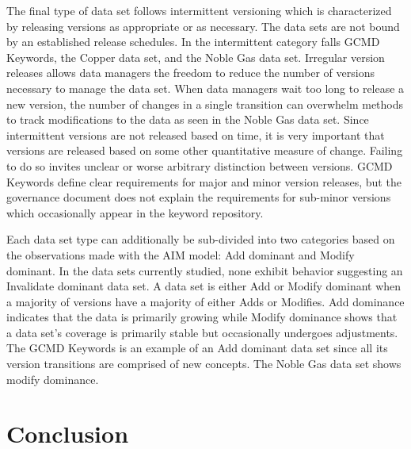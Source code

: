 The final type of data set follows intermittent versioning which is characterized by releasing versions as appropriate or as necessary.  The data sets are not bound by an established release schedules.  In the intermittent category falls GCMD Keywords, the Copper data set, and the Noble Gas data set.  Irregular version releases allows data managers the freedom to reduce the number of versions necessary to manage the data set.  When data managers wait too long to release a new version, the number of changes in a single transition can overwhelm methods to track modifications to the data as seen in the Noble Gas data set.  Since intermittent versions are not released based on time, it is very important that versions are released based on some other quantitative measure of change.  Failing to do so invites unclear or worse arbitrary distinction between versions.  GCMD Keywords define clear requirements for major and minor version releases, but the governance document does not explain the requirements for sub-minor versions which occasionally appear in the keyword repository.

Each data set type can additionally be sub-divided into two categories based on the observations made with the AIM model: Add dominant and Modify dominant.  In the data sets currently studied, none exhibit behavior suggesting an Invalidate dominant data set.  A data set is either Add or Modify dominant when a majority of versions have a majority of either Adds or Modifies.  Add dominance indicates that the data is primarily growing while Modify dominance shows that a data set’s coverage is primarily stable but occasionally undergoes adjustments.  The GCMD Keywords is an example of an Add dominant data set since all its version transitions are comprised of new concepts.  The Noble Gas data set shows modify dominance.

\section{Conclusion}

